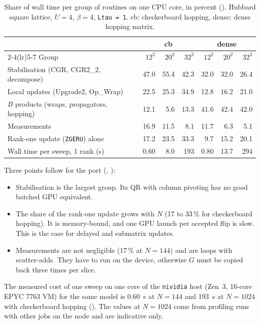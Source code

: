 \begin{table}[h]
\centering
\caption{Share of wall time per group of routines on one CPU core, in percent (). Hubbard square lattice, $U=4$, $\beta=4$, \texttt{Ltau = 1}. cb: checkerboard hopping, dense: dense hopping matrix.}
\label{tab:cpuprofile}
\begin{tabular}{@{}p{5.6cm}rrrrrr@{}}
\toprule
 & \multicolumn{3}{c}{cb} & \multicolumn{3}{c}{dense} \\
\cmidrule(lr){2-4}\cmidrule(lr){5-7}
Group & $12^2$ & $20^2$ & $32^2$ & $12^2$ & $20^2$ & $32^2$ \\
\midrule
Stabilisation (CGR, CGR2\_2, decompose) & 47.0 & 55.4 & 42.3 & 32.0 & 32.0 & 26.4 \\ %
Local updates (Upgrade2, Op\_Wrap) & 22.5 & 25.3 & 34.9 & 12.8 & 16.2 & 21.0 \\ %
$B$ products (wraps, propagators, hopping) & 12.1 & 5.6 & 13.3 & 41.6 & 42.4 & 42.0 \\ %
Measurements & 16.9 & 11.5 & 8.1 & 11.7 & 6.3 & 5.1 \\ %
\midrule
Rank-one update (\texttt{ZGERU}) alone & 17.2 & 23.5 & 33.3 & 9.7 & 15.2 & 20.1 \\ %
Wall time per sweep, 1 rank (s) & 0.60 & 8.0 & 193 & 0.80 & 13.7 & 294 \\ %
\bottomrule
\end{tabular}
\end{table}

Three points follow for the port (, ):
\begin{itemize}
\item Stabilisation is the largest group. Its QR with column pivoting has no good batched GPU equivalent.
\item The share of the rank-one update grows with $N$ (17 to 33\,\% for checkerboard hopping). It is memory-bound, and one GPU launch per accepted flip is slow. This is the case for delayed and submatrix updates.
\item Measurements are not negligible (17\,\% at $N=144$) and are loops with scatter-adds. They have to run on the device, otherwise $G$ must be copied back three times per slice.
\end{itemize}

The measured cost of one sweep on one core of the \texttt{nividia} host (Zen~3, 16-core EPYC 7763 VM) for the same model is 0.60~s at $N=144$ and 193~s at $N=1024$ with checkerboard hopping (). The values at $N=1024$ come from profiling runs with other jobs on the node and are indicative only.

